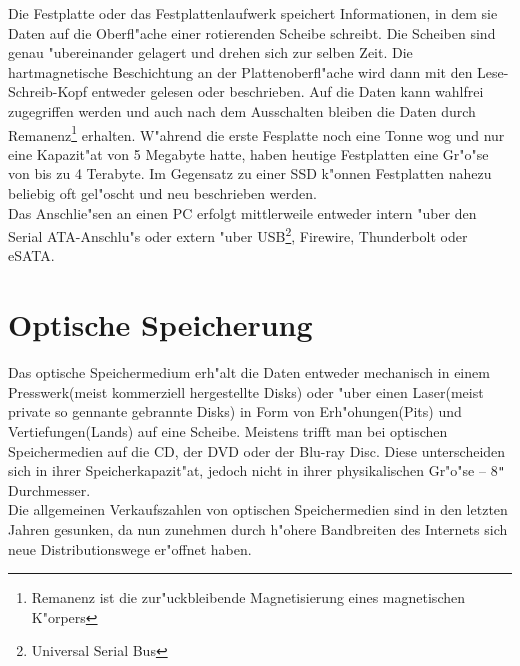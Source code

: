             Die Festplatte oder das Festplattenlaufwerk speichert Informationen, in dem sie Daten auf die Oberfl"ache einer rotierenden Scheibe schreibt. Die Scheiben sind genau "ubereinander gelagert und drehen sich zur selben Zeit. Die hartmagnetische Beschichtung an der Plattenoberfl"ache wird dann mit den Lese-Schreib-Kopf entweder gelesen oder beschrieben. Auf die Daten kann wahlfrei zugegriffen werden und auch nach dem Ausschalten bleiben die Daten durch Remanenz\footnote[7]{Remanenz ist die zur"uckbleibende Magnetisierung eines magnetischen K"orpers} erhalten. W"ahrend die erste Fesplatte noch eine Tonne wog und nur eine Kapazit"at von 5 Megabyte hatte, haben heutige Festplatten eine Gr"o"se von bis zu 4 Terabyte. Im Gegensatz zu einer SSD k"onnen Festplatten nahezu beliebig oft gel"oscht und neu beschrieben werden.
            \\
            Das Anschlie"sen an einen PC erfolgt mittlerweile entweder intern "uber den Serial ATA-Anschlu"s oder extern "uber USB\footnote[8]{Universal Serial Bus}, Firewire, Thunderbolt oder eSATA. 
    
    
    \section{Optische Speicherung}
    \label{ch:Technisch:sec:Optische Speicherung}
    
        Das optische Speichermedium erh"alt die Daten entweder mechanisch in einem Presswerk(meist kommerziell hergestellte Disks) oder "uber einen Laser(meist private so gennante \glqq gebrannte\grqq{} Disks) in Form von Erh"ohungen(Pits) und Vertiefungen(Lands) auf eine Scheibe. Meistens trifft man bei optischen Speichermedien auf die CD, der DVD oder der Blu-ray Disc. Diese unterscheiden sich in ihrer Speicherkapazit"at, jedoch nicht in ihrer physikalischen Gr"o"se – 8\texttt{"{}} Durchmesser.
        \\
         Die allgemeinen Verkaufszahlen von optischen Speichermedien sind in den letzten Jahren gesunken, da nun zunehmen durch h"ohere Bandbreiten des Internets sich neue Distributionswege er"offnet haben.

